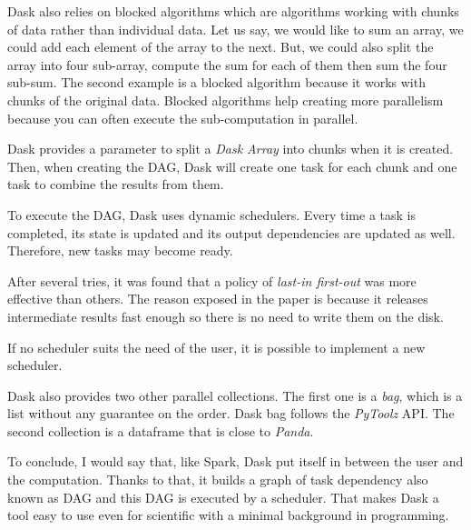 \documentclass{article}
\begin{document}
Dask also relies on blocked algorithms which are algorithms working with chunks of data rather than individual data.
Let us say, we would like to sum an array, we could add each element of the array to the next.
But, we could also split the array into four sub-array, compute the sum for each of them then sum the four sub-sum.
The second example is a blocked algorithm because it works with chunks of the original data.
Blocked algorithms help creating more parallelism because you can often execute the sub-computation in parallel.

Dask provides a parameter to split a \textit{Dask Array} into chunks when it is created.
Then, when creating the DAG, Dask will create one task for each chunk and one task to combine the results from them.

To execute the DAG, Dask uses dynamic schedulers.
Every time a task is completed, its state is updated and its output dependencies are updated as well.
Therefore, new tasks may become ready.

After several tries, it was found that a policy of \textit{last-in first-out} was more effective than others.
The reason exposed in the paper is because it releases intermediate results fast enough so there is no need to write them on the disk.

If no scheduler suits the need of the user, it is possible to implement a new scheduler.

Dask also provides two other parallel collections.
The first one is a \textit{bag}, which is a list without any guarantee on the order.
Dask bag follows the \textit{PyToolz} API.
The second collection is a dataframe that is close to \textit{Panda}.

To conclude, I would say that, like Spark, Dask put itself in between the user and the computation.
Thanks to that, it builds a graph of task dependency also known as DAG and this DAG is executed by a scheduler.
That makes Dask a tool easy to use even for scientific with a minimal background in programming.
\end{document}
